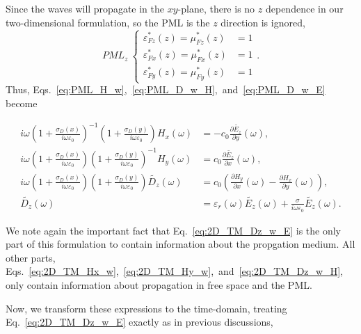 \documentclass[12pt,twocolumn]{article}
\begin{document}
Since the waves will propagate in the $xy$-plane, there is no $z$ dependence in our two-dimensional formulation, so the PML is the $z$ direction is ignored,
\begin{subequations}
\begin{equation}
\textit{PML}_z~\left\{\begin{split}
\varepsilon_{Fz}^*(z)=\mu_{Fz}^*(z)&=1\\
\varepsilon_{Fx}^*(z)=\mu_{Fx}^*(z)&=1\\
\varepsilon_{Fy}^*(z)=\mu_{Fy}^*(z)&=1
\end{split}\right..
\end{equation}
\end{subequations}
 Thus, Eqs.~\ref{eq:PML_H_w},~\ref{eq:PML_D_w_H},~and~\ref{eq:PML_D_w_E} become
\begin{strip}
\begin{subequations}
\begin{align}
\label{eq:2D_TM_Hx_w}i\omega\left(1+\frac{\sigma_D(x)}{i\omega\varepsilon_0}\right)^{-1}\left(1+\frac{\sigma_D(y)}{i\omega\varepsilon_0}\right)H_x(\omega) &= -c_0\frac{\partial \tilde{E_z}}{\partial y}(\omega),\\
\label{eq:2D_TM_Hy_w}i\omega\left(1+\frac{\sigma_D(x)}{i\omega\varepsilon_0}\right)\left(1+\frac{\sigma_D(y)}{i\omega\varepsilon_0}\right)^{-1}H_y(\omega) &= c_0\frac{\partial \tilde{E_z}}{\partial x}(\omega),\\
\label{eq:2D_TM_Dz_w_H}i\omega\left(1+\frac{\sigma_D(x)}{i\omega\varepsilon_0}\right)\left(1+\frac{\sigma_D(y)}{i\omega\varepsilon_0}\right)\tilde{D_z}(\omega) &= c_0\left(\frac{\partial H_y}{\partial x}(\omega)-\frac{\partial H_x}{\partial y}(\omega)\right),\\
\label{eq:2D_TM_Dz_w_E}\tilde{D_z}(\omega)&=\varepsilon_r(\omega)\tilde{E_z}(\omega)+\frac{\sigma}{i\omega\varepsilon_0}\tilde{E_z}(\omega).
\end{align}
\end{subequations}
\end{strip}

\noindent We note again the important fact that Eq.~\ref{eq:2D_TM_Dz_w_E} is the only part of this formulation to contain information about the propgation medium. All other parts, Eqs.~\ref{eq:2D_TM_Hx_w},~\ref{eq:2D_TM_Hy_w},~and~\ref{eq:2D_TM_Dz_w_H}, only contain information about propagation in free space and the PML.

Now, we transform these expressions to the time-domain, treating Eq.~\ref{eq:2D_TM_Dz_w_E} exactly as in previous discussions,
\begin{strip}
\begin{subequations}
\begin{align}
\end{align}
\end{subequations}
\end{strip}
\end{document}
